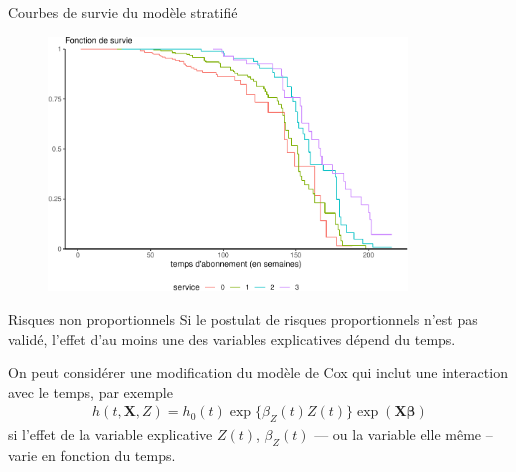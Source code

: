\documentclass[
  ignorenonframetext,
]{beamer}
\begin{document}
\begin{frame}{Courbes de survie du modèle stratifié}
\protect\hypertarget{courbes-de-survie-du-moduxe8le-stratifiuxe9}{}
\begin{figure}

{\centering \includegraphics[width=0.85\textwidth,height=\textheight]{MATH60602-diapos10_files/figure-beamer/unnamed-chunk-6-1.pdf}

}

\end{figure}
\end{frame}

\begin{frame}{Risques non proportionnels}
\protect\hypertarget{risques-non-proportionnels}{}
Si le postulat de risques proportionnels n'est pas validé, l'effet d'au
moins une des variables explicatives dépend du temps.

On peut considérer une modification du modèle de Cox qui inclut une
interaction avec le temps, par exemple \begin{align*}
h(t,\mathbf{X}, Z) = h_0(t)\exp\{\beta_Z(t) Z(t)\}\exp(\mathbf{X}\boldsymbol{\beta})
\end{align*} si l'effet de la variable explicative \(Z(t)\),
\(\beta_Z(t)\) --- ou la variable elle même -- varie en fonction du
temps.
\end{frame}
\end{document}
